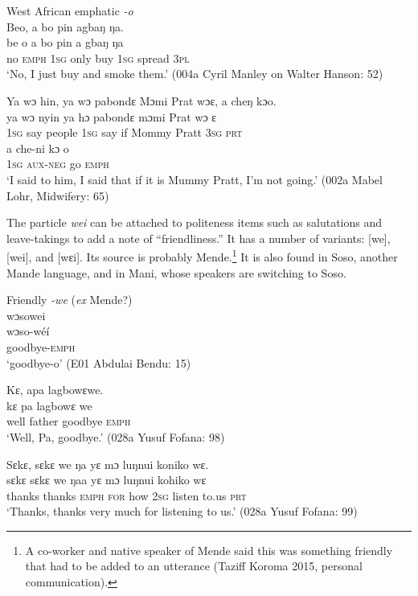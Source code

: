 \ea%
    \label{ex:106}
    West African emphatic \textit{{}-o}\\
  \ea Beo,  a  bo  pin  agbaŋ    ŋa.\\
  \gll be    o      a    bo    pin  a    gbaŋ    ŋa\\
  no    \textsc{emph}    \textsc{1sg}  only  buy  \textsc{1sg}  spread  \textsc{3pl}\\
  \glt ‘No, I just buy and smoke them.' (004a Cyril Manley on Walter Hanson: 52)

  \ex Ya wɔ hin, ya wɔ pabondɛ Mɔmi Prat wɔɛ, a cheŋ kɔo.\\
  \gll ya    wɔ    nyin    ya    hɔ    pabondɛ    mɔmi      Prat  wɔ    ɛ\\
  \textsc{1sg}  say  people  \textsc{1sg}  say  if        Mommy    Pratt  3\textsc{sg}  \textsc{prt}\\
  \gll a    che-ni      kɔ    o\\
  \textsc{1sg}  \textsc{aux-neg}  go    \textsc{emph}\\
  \glt ‘I said to him, I said that if it is Mummy Pratt, I'm not going.' (002a Mabel Lohr, Midwifery: 65)
\z
\z

The particle \textit{wei} can be attached to politeness items such as salutations and leave-takings to add a note of “friendliness.” It has a number of variants: [we], [wei], and [wɛi]. Its source is probably Mende.\footnote{A co-worker and native speaker of Mende said this was something friendly that had to be added to an utterance (Taziff Koroma 2015, personal communication).} It is also found in Soso, another Mande language, and in Mani, whose speakers are switching to Soso.

\ea%
    \label{ex:107}
    Friendly \textit{{}-we} (\textit{ex} Mende?)\\
  \ea wɔsowei\\
  \gll wɔso-wéí\\
  goodbye-\textsc{emph}\\
  \glt ‘goodbye-o' (E01 Abdulai Bendu: 15)

  \ex Kɛ, apa lagbowɛwe.\\
  \gll kɛ    pa      lagbowɛ    we\\
  well  father    goodbye    \textsc{emph}\\
  \glt ‘Well, Pa, goodbye.' (028a Yusuf Fofana: 98)

	\ex  Sɛkɛ, sɛkɛ we ŋa yɛ mɔ luŋnui koniko wɛ.\\
  	\gll sɛkɛ    sɛkɛ    we      ŋaa  yɛ    mɔ  luŋnui  kohiko  wɛ\\
  thanks  thanks  \textsc{emph}    \textsc{for}  how  \textsc{2sg}  listen    to.us    \textsc{prt}\\
  \glt ‘Thanks, thanks very much for listening to us.' (028a Yusuf Fofana: 99)
\z
\z

